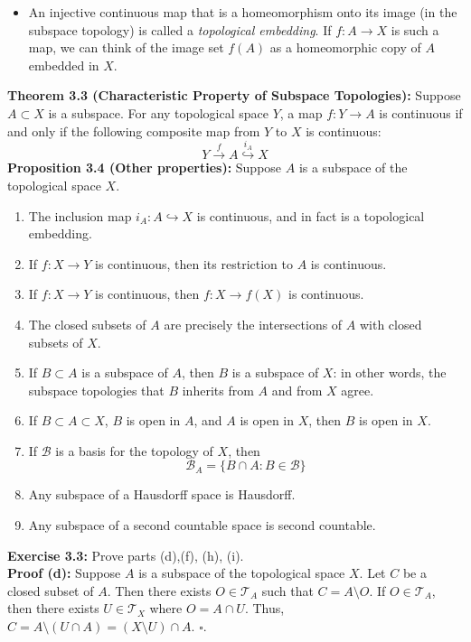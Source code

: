 \documentclass{article}
\begin{document}
\begin{itemize}
    \item An injective continuous map that is a homeomorphism onto its image (in the subspace topology) is called a \textit{topological embedding}. If $f:A\to X$ is such a map, we can think of the image set $f(A)$ as a homeomorphic copy of $A$ embedded in $X$.
\end{itemize}
\textbf{Theorem 3.3 (Characteristic Property of Subspace Topologies):} Suppose $A\subset X$ is a subspace. For any topological space $Y$, a map $f:Y\to A$ is continuous if and only if the following composite map from $Y$ to $X$ is continuous:\\
\begin{equation*}
    Y\xrightarrow{f} A \overset{i_A}{\hookrightarrow} X
\end{equation*}
\textbf{Proposition 3.4 (Other properties):} Suppose $A$ is a subspace of the topological space $X$.
\begin{enumerate}[label=(\alph*.)]
    \item The inclusion map $i_A: A\hookrightarrow X$ is continuous, and in fact is a topological embedding.
    \item If $f:X\to Y$ is continuous, then its restriction to $A$ is continuous.
    \item If $f:X\to Y$ is continuous, then $f:X\to f(X)$ is continuous.
    \item The closed subsets of $A$ are precisely the intersections of $A$ with closed subsets of $X$.
    \item If $B\subset A$ is a subspace of $A$, then $B$ is a subspace of $X$: in other words, the subspace topologies that $B$ inherits from $A$ and from $X$ agree.
    \item If $B\subset A\subset X$, $B$ is open in $A$, and $A$ is open in $X$, then $B$ is open in $X$.
    \item If $\mathcal{B}$ is a basis for the topology of $X$, then
    \begin{equation*}
        \mathcal{B}_A=\{B\cap A:B\in \mathcal{B}\}
    \end{equation*}
    \item Any subspace of a Hausdorff space is Hausdorff.
    \item Any subspace of a second countable space is second countable.
\end{enumerate}

\textbf{Exercise 3.3:} Prove parts (d),(f), (h), (i).\\
\textbf{Proof (d):} Suppose $A$ is a subspace of the topological space $X$. Let $C$ be a closed subset of $A$. Then there exists $O\in \mathcal{T}_A$ such that $C=A\setminus O$. If $O\in\mathcal{T}_A$, then there exists $U\in\mathcal{T}_X$ where $O=A\cap U$. Thus, $C=A\setminus(U\cap A)=(X\setminus U) \cap A$. $\square$.\\
\end{document}
